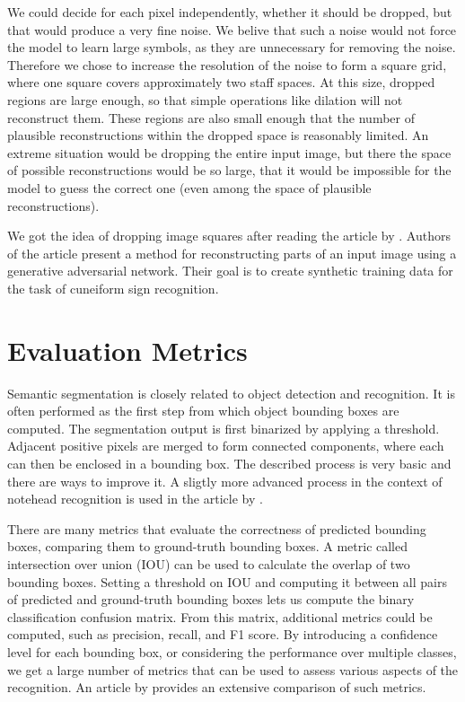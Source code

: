 We could decide for each pixel independently, whether it should be dropped, but that would produce a very fine noise. We belive that such a noise would not force the model to learn large symbols, as they are unnecessary for removing the noise. Therefore we chose to increase the resolution of the noise to form a square grid, where one square covers approximately two staff spaces. At this size, dropped regions are large enough, so that simple operations like dilation will not reconstruct them. These regions are also small enough that the number of plausible reconstructions within the dropped space is reasonably limited. An extreme situation would be dropping the entire input image, but there the space of possible reconstructions would be so large, that it would be impossible for the model to guess the correct one (even among the space of plausible reconstructions).

We got the idea of dropping image squares after reading the article by \cite{Cuneiforms}. Authors of the article present a method for reconstructing parts of an input image using a generative adversarial network. Their goal is to create synthetic training data for the task of cuneiform sign recognition.


\section{Evaluation Metrics}
\label{sec:EvaluationMetrics}

Semantic segmentation is closely related to object detection and recognition. It is often performed as the first step from which object bounding boxes are computed. The segmentation output is first binarized by applying a threshold. Adjacent positive pixels are merged to form connected components, where each can then be enclosed in a bounding box. The described process is very basic and there are ways to improve it. A sligtly more advanced process in the context of notehead recognition is used in the article by \cite{DorferEtAl}.

There are many metrics that evaluate the correctness of predicted bounding boxes, comparing them to ground-truth bounding boxes. A metric called intersection over union (IOU) can be used to calculate the overlap of two bounding boxes. Setting a threshold on IOU and computing it between all pairs of predicted and ground-truth bounding boxes lets us compute the binary classification confusion matrix. From this matrix, additional metrics could be computed, such as precision, recall, and F1 score. By introducing a confidence level for each bounding box, or considering the performance over multiple classes, we get a large number of metrics that can be used to assess various aspects of the recognition. An article by \cite{PadillaMetrics} provides an extensive comparison of such metrics.

